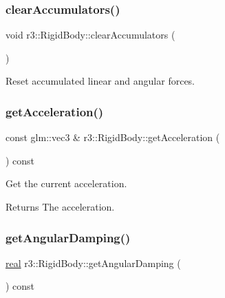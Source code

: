 \subsubsection{\texorpdfstring{clear\+Accumulators()}{clearAccumulators()}}
{\footnotesize\ttfamily void r3\+::\+Rigid\+Body\+::clear\+Accumulators (\begin{DoxyParamCaption}{ }\end{DoxyParamCaption})}



Reset accumulated linear and angular forces. 

\mbox{\label{classr3_1_1_rigid_body_a671c60af58aea7cff7fe3e029fa5ef71}} 
\subsubsection{\texorpdfstring{get\+Acceleration()}{getAcceleration()}}
{\footnotesize\ttfamily const glm\+::vec3 \& r3\+::\+Rigid\+Body\+::get\+Acceleration (\begin{DoxyParamCaption}{ }\end{DoxyParamCaption}) const}



Get the current acceleration. 

\begin{DoxyReturn}{Returns}
The acceleration. 
\end{DoxyReturn}
\mbox{\label{classr3_1_1_rigid_body_afcef73f6bf5ad38780f39c8ebb5c4af1}} 
\subsubsection{\texorpdfstring{get\+Angular\+Damping()}{getAngularDamping()}}
{\footnotesize\ttfamily \mbox{\hyperlink{namespacer3_ab2016b3e3f743fb735afce242f0dc1eb}{real}} r3\+::\+Rigid\+Body\+::get\+Angular\+Damping (\begin{DoxyParamCaption}{ }\end{DoxyParamCaption}) const}



